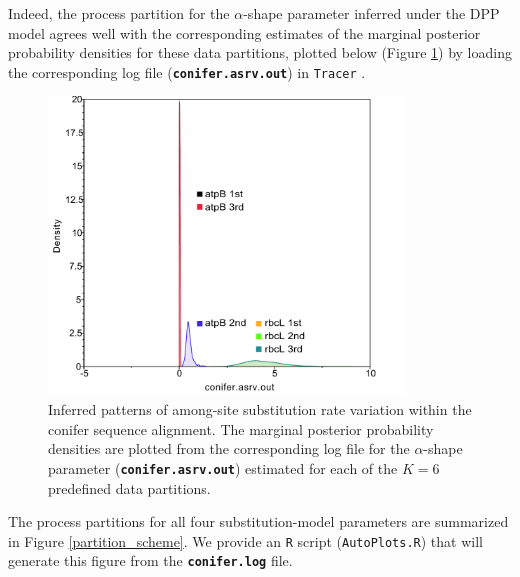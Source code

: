 \documentclass[11pt]{article}
\newcommand{\cl}[1]{{\texttt{\textbf{#1}}}}
\begin{document}
Indeed, the process partition for the $\alpha$-shape parameter inferred under the DPP model agrees well with the corresponding estimates of the marginal posterior probability densities for these data partitions, plotted below (Figure \ref{alpha}) by loading the corresponding log file (\cl{conifer.asrv.out}) in \verb!Tracer! \citep{rambaut07}.

\newpage

\begin{figure}[H] 
\centering 
\includegraphics[width=95mm]{./figures/alpha_marginals.pdf} 
\caption{Inferred patterns of among-site substitution rate variation within the conifer sequence alignment.  The marginal posterior probability densities are plotted from the corresponding log file for the $\alpha$-shape parameter (\cl{conifer.asrv.out}) estimated for each of the $K = 6$ predefined data partitions.}
\label{alpha}
\end{figure} \vspace{-5mm}

The process partitions for all four substitution-model parameters are summarized in Figure \ref{partition_scheme}.
We provide an \verb!R! script (\verb!AutoPlots.R!) that will generate this figure from the \cl{conifer.log} file.
\end{document}

